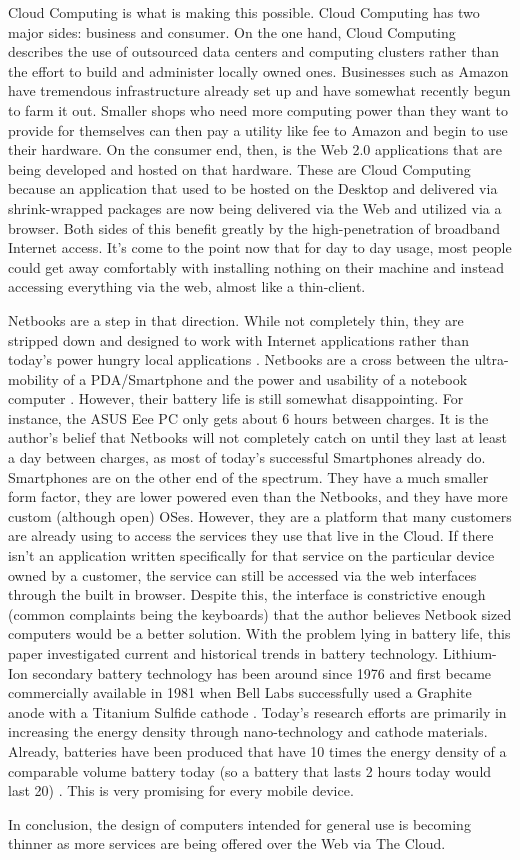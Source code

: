 Cloud Computing is what is making this possible.  Cloud Computing has two major
sides: business and consumer.  On the one hand, Cloud Computing describes the
use of outsourced data centers and computing clusters rather than the effort to
build and administer locally owned ones.  Businesses such as Amazon have
tremendous infrastructure already set up and have somewhat recently begun to
farm it out.  Smaller shops who need more computing power than they want to
provide for themselves can then pay a utility like fee to Amazon and begin to
use their hardware.  On the consumer end, then, is the Web 2.0 applications that
are being developed and hosted on that hardware.  These are Cloud Computing
because an application that used to be hosted on the Desktop and delivered via
shrink-wrapped packages are now being delivered via the Web and utilized via a
browser.  Both sides of this benefit greatly by the high-penetration of
broadband Internet access.  It's come to the point now that for day to day
usage, most people could get away comfortably with installing nothing on their
machine and instead accessing everything via the web, almost like a thin-client.

Netbooks are a step in that direction.  While not completely thin, they are
stripped down and designed to work with Internet applications rather than
today's power hungry local applications \citep{bergevin2008}.  Netbooks are a
cross between the ultra-mobility of a PDA/Smartphone and the power and usability
of a notebook computer \citep{copeland2008}.  However, their battery life is
still somewhat disappointing.  For instance, the ASUS Eee PC only gets about 6
hours between charges.  It is the author's belief that Netbooks will not
completely catch on until they last at least a day between charges, as most of
today's successful Smartphones already do.  Smartphones are on the other end of
the spectrum.  They have a much smaller form factor, they are lower powered even
than the Netbooks, and they have more custom (although open) OSes.  However,
they are a platform that many customers are already using to access the services
they use that live in the Cloud.  If there isn't an application written
specifically for that service on the particular device owned by a customer, the
service can still be accessed via the web interfaces through the built in
browser.  Despite this, the interface is constrictive enough (common complaints
being the keyboards) that the author believes Netbook sized computers would be a
better solution.  With the problem lying in battery life, this paper
investigated current and historical trends in battery technology.  Lithium-Ion
secondary battery technology has been around since 1976 and first became
commercially available in 1981 when Bell Labs successfully used a Graphite anode
with a Titanium Sulfide cathode \citep{samar1981}.  Today's research efforts are
primarily in increasing the energy density through nano-technology and cathode
materials.  Already, batteries have been produced that have 10 times the energy
density of a comparable volume battery today (so a battery that lasts 2 hours
today would last 20) \citep{stanford2007}.  This is very promising for every
mobile device.

In conclusion, the design of computers intended for general use is becoming
thinner as more services are being offered over the Web via The Cloud.

